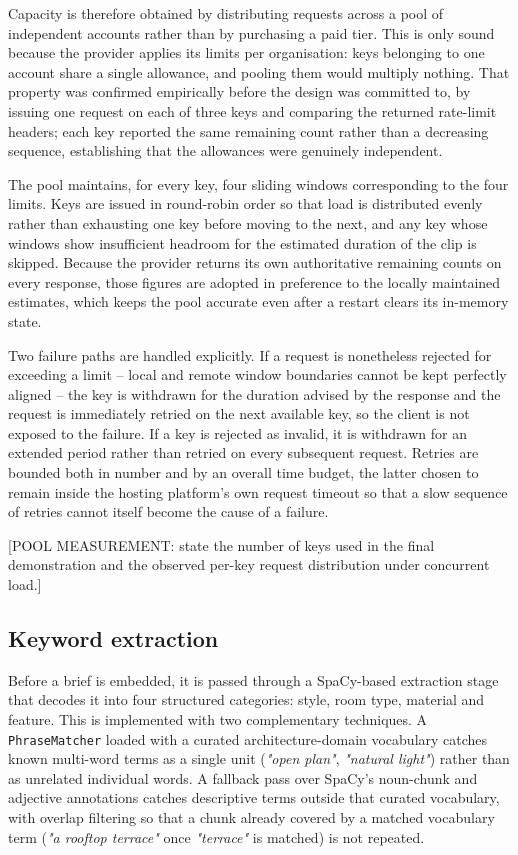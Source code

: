 Capacity is therefore obtained by distributing requests across a pool of
independent accounts rather than by purchasing a paid tier. This is only
sound because the provider applies its limits per organisation: keys
belonging to one account share a single allowance, and pooling them
would multiply nothing. That property was confirmed empirically before
the design was committed to, by issuing one request on each of three
keys and comparing the returned rate-limit headers; each key reported
the same remaining count rather than a decreasing sequence, establishing
that the allowances were genuinely independent.

The pool maintains, for every key, four sliding windows corresponding to
the four limits. Keys are issued in round-robin order so that load is
distributed evenly rather than exhausting one key before moving to the
next, and any key whose windows show insufficient headroom for the
estimated duration of the clip is skipped. Because the provider returns
its own authoritative remaining counts on every response, those figures
are adopted in preference to the locally maintained estimates, which
keeps the pool accurate even after a restart clears its in-memory state.

Two failure paths are handled explicitly. If a request is nonetheless
rejected for exceeding a limit -- local and remote window boundaries
cannot be kept perfectly aligned -- the key is withdrawn for the
duration advised by the response and the request is immediately retried
on the next available key, so the client is not exposed to the failure.
If a key is rejected as invalid, it is withdrawn for an extended period
rather than retried on every subsequent request. Retries are bounded
both in number and by an overall time budget, the latter chosen to
remain inside the hosting platform's own request timeout so that a slow
sequence of retries cannot itself become the cause of a failure.

[POOL MEASUREMENT: state the number of keys used in the final
demonstration and the observed per-key request distribution under
concurrent load.]

\subsection{Keyword extraction}
\label{subsec:keyword-extraction}

Before a brief is embedded, it is passed through a SpaCy-based
extraction stage that decodes it into four structured categories: style,
room type, material and feature. This is implemented with two
complementary techniques. A \texttt{PhraseMatcher} loaded with a curated
architecture-domain vocabulary catches known multi-word terms as a
single unit (\emph{"open plan"}, \emph{"natural light"}) rather than as
unrelated individual words. A fallback pass over SpaCy's noun-chunk and
adjective annotations catches descriptive terms outside that curated
vocabulary, with overlap filtering so that a chunk already covered by a
matched vocabulary term (\emph{"a rooftop terrace"} once
\emph{"terrace"} is matched) is not repeated.

